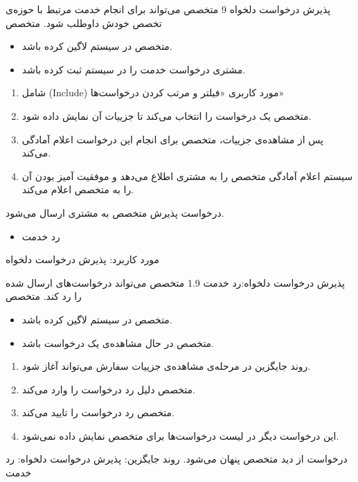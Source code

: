 {
\usecase
{پذیرش درخواست دلخواه}
{9}
{متخصص می‌تواند برای انجام خدمت مرتبط با حوزه‌ی تخصص خودش داوطلب شود.}
{متخصص}
{}
{	
	\begin{itemize}
		\vspace*{-0.6cm}
		\item 
		متخصص در سیستم لاگین کرده باشد.
		\item
		مشتری درخواست خدمت را در سیستم ثبت کرده باشد.
	\end{itemize}
}
{
	\vspace*{-0.6cm}
	\begin{enumerate}
		\item 
		شامل (Include) مورد کاربری «فیلتر و مرتب کردن درخواست‌ها»
		\item
		متخصص یک درخواست را انتخاب می‌کند تا جزییات آن نمایش داده شود.
		\item
		پس از مشاهده‌ی جزییات، متخصص برای انجام این درخواست اعلام آمادگی می‌کند.
		\item
		سیستم اعلام آمادگی متخصص را به مشتری اطلاع می‌دهد و موفقیت آمیز بودن آن را به متخصص اعلام می‌کند.
	\end{enumerate}
}
{درخواست پذیرش متخصص به مشتری ارسال می‌شود.}
{
	\begin{itemize}
		\vspace*{-0.6cm}
		\item
		رد خدمت
	\end{itemize}
}
{
	مورد کاربرد: پذیرش درخواست دلخواه
}

\alternativeflow
{
	 پذیرش درخواست دلخواه:رد خدمت
}
{1.9}
{
	متخصص می‌تواند درخواست‌های ارسال شده را رد کند.
}
{
	متخصص
}
{}
{
	\begin{itemize}
		\vspace*{-0.6cm}
		\item 
		متخصص در سیستم لاگین کرده باشد.
		\item
		متخصص در حال مشاهده‌ی یک درخواست باشد.
	\end{itemize}
}
{
	\vspace*{-0.6cm}
	\begin{enumerate}
		\item 
		روند جایگزین در مرحله‌ی مشاهده‌ی جزییات سفارش می‌تواند آغاز شود.
		\item
		متخصص دلیل رد درخواست را وارد می‌کند.
		\item
		متخصص رد درخواست را تایید می‌کند.
		\item
		این درخواست دیگر در لیست درخواست‌ها برای متخصص نمایش داده نمی‌شود.
	\end{enumerate}
}
{
	درخواست از دید متخصص پنهان می‌شود.
}
{
روند جایگزین: پذیرش درخواست دلخواه: رد خدمت
}
}

